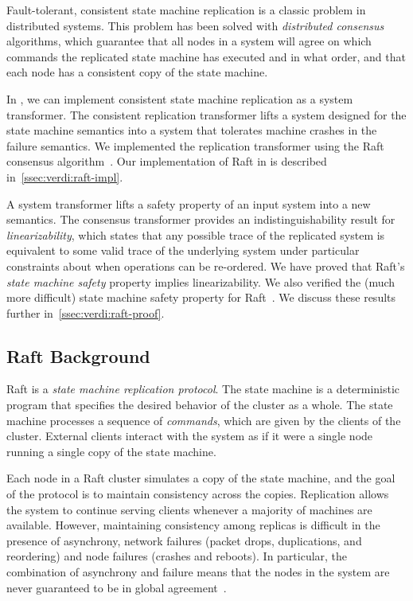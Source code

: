 Fault-tolerant, consistent state machine replication
is a classic problem in distributed systems.
This problem has been
solved with \textit{distributed consensus} algorithms, which guarantee
that all nodes in a system will agree on which commands the replicated
state machine has executed and in what order, and that each node has a
consistent copy of the state machine.

In \Verdi, we can implement consistent state machine replication as a
system transformer. The consistent replication transformer lifts a
system designed for the state machine semantics into a system that
tolerates machine crashes in the failure semantics. We implemented the
replication transformer using the Raft consensus
algorithm~\cite{ongaro:raft}. Our implementation of Raft in \Verdi is
described in~\cref{ssec:verdi:raft-impl}.

A \Verdi system transformer lifts a safety property of an input
system into a new semantics. The consensus transformer provides an
indistinguishability result for \textit{linearizability}, which states
that any possible trace of the replicated system is equivalent to some
valid trace of the underlying system under particular constraints
about when operations can be re-ordered. We have proved that Raft's
\textit{state machine safety} property implies linearizability.
We also verified the (much more difficult) state machine safety property
for Raft~\cite{Woos-al:CPP16}.
We discuss these results further in~\cref{ssec:verdi:raft-proof}.

\subsection{Raft Background}\label{ssec:verdi:raft-background}

Raft is a \textit{state machine replication protocol}.
The state machine is a deterministic program that specifies
the desired behavior of the cluster as a whole.
The state machine processes a sequence of \emph{commands},
which are given by the clients of the cluster.
External clients interact with
the system as if it were a single node running
a single copy of the state machine.

Each node in a Raft cluster simulates a copy of the state machine,
and the goal of the protocol is to maintain consistency across the copies.
Replication allows the system to continue
serving clients whenever a majority of machines are available.
However, maintaining consistency among replicas
is difficult in the presence of asynchrony,
network failures (packet drops, duplications, and reordering)
and node failures (crashes and reboots).
In particular, the combination of asynchrony and failure means that
the nodes in the system are never guaranteed
to be in global agreement~\cite{flp}.

